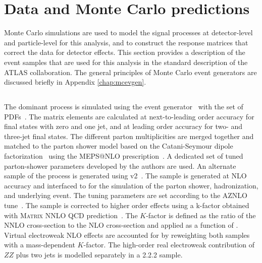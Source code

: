 \section{Data and Monte Carlo predictions}
\label{sec:montecarlopred}
Monte Carlo simulations are used to model the signal processes at detector-level and particle-level for this analysis, and to construct the response matrices that correct the data for detector effects. This section provides a description of the event samples that are used for this analysis in the standard description of the ATLAS collaboration. The general principles of Monte Carlo event generators are discussed briefly in Appendix \ref{chap:mcevgen}.

\subsection{\qqFourL}
The dominant \qqFourL process is simulated using the  event generator~\cite{Bothmann:2019yzt} with the \nnpdfnnlo{} set of PDFs~\cite{Ball:2014uwa}. The matrix elements are calculated at next-to-leading order accuracy for final states with zero and one jet, and at leading order accuracy for two- and three-jet final states. The different parton multiplicities are merged together and matched to the \SHERPA parton shower model based on the Catani-Seymour dipole factorization~\cite{Gleisberg:2008fv,Schumann:2007mg} using the MEPS@NLO prescription~\cite{Hoeche:2011fd,Hoeche:2012yf,Catani:2001cc,Hoeche:2009r}. A dedicated set of tuned parton-shower parameters developed by the \SHERPA authors are used. 
An alternate sample of the \qqFourL process is generated using  \POWHEGBOX v2~\cite{Alioli:2010xd,Melia:2011tj,Nason:2013ydw}. The sample is generated at NLO accuracy and interfaced to  for the simulation of the parton shower, hadronization, and underlying event. The tuning parameters are set according to the AZNLO tune~\cite{STDM-2012-23}. The sample is corrected to higher order effects using a k-factor obtained with \textsc{Matrix} NNLO QCD prediction~\cite{Cascioli:2014yka,Grazzini:2015hta,Grazzini:2017mhc,Kallweit:2018nyv}. The $K$-factor is defined as the ratio of the NNLO cross-section to the NLO cross-section and applied as a function of \mFourL{}. 
Virtual electroweak NLO effects are accounted for by reweighting both samples with a mass-dependent $K$-factor. The high-order real electroweak contribution of $ZZ$ plus two jets is modelled separately in a \SHERPA{} {2.2.2} sample. 

